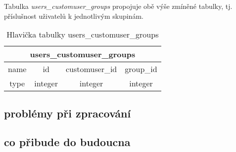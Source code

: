 \begin{table}[H]
\centering
{}
\caption{Atributy tabulky users\_customuser 1/2}
\label{tab:users-customuser-1}
\end{table}

\begin{table}[H]
\centering
{}
\caption{Atributy tabulky users\_customuser 2/2}
\label{tab:users-customuser-2}
\end{table}

Tabulka \textit{users\_customuser\_groups} propojuje obě výše zmíněné tabulky, tj. příslušnost uživatelů k jednotlivým skupinám.

\begin{table}[H]
\centering
\begin{tabular}{@{}|c|c|c|c|@{}}
\toprule
\multicolumn{4}{|c|}{users\_customuser\_groups} \\ \midrule
name & id & customuser\_id & group\_id \\ \midrule
type & integer & integer & integer \\ \bottomrule
\end{tabular}
\caption{Hlavička tabulky users\_customuser\_groups}
\label{tab:users-customuser-groups}
\end{table}

\subsection{problémy při zpracování}

\subsection{co přibude do budoucna}
\label{python-knihovna}


